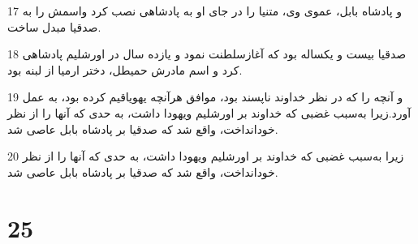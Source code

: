 \par 17 و پادشاه بابل، عموی وی، متنیا را در جای او به پادشاهی نصب کرد واسمش را به صدقیا مبدل ساخت.
\par 18 صدقیا بیست و یکساله بود که آغازسلطنت نمود و یازده سال در اورشلیم پادشاهی کرد و اسم مادرش حمیطل، دختر ارمیا از لبنه بود.
\par 19 و آنچه را که در نظر خداوند ناپسند بود، موافق هرآنچه یهویاقیم کرده بود، به عمل آورد.زیرا به‌سبب غضبی که خداوند بر اورشلیم ویهودا داشت، به حدی که آنها را از نظر خودانداخت، واقع شد که صدقیا بر پادشاه بابل عاصی شد.
\par 20 زیرا به‌سبب غضبی که خداوند بر اورشلیم ویهودا داشت، به حدی که آنها را از نظر خودانداخت، واقع شد که صدقیا بر پادشاه بابل عاصی شد.
 
\chapter{25}

